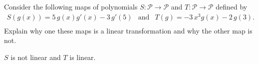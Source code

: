 
\begin{exerciseStatement}


Consider the following maps of polynomials \(S:\mathcal{P}\rightarrow\mathcal{P}\) and \(T:\mathcal{P}\rightarrow\mathcal{P}\) defined by 
\begin{align*} S(g(x))= 5 \, g\left(x\right) g'\left(x\right) - 3 \, g'\left(5\right)  & \text{and} & T(g)= -3 \, x^{3} g\left(x\right) - 2 \, g\left(3\right) . \\ \end{align*}
             Explain why one these maps is a linear transformation and why the other map is not. 


\end{exerciseStatement}
    
\begin{exerciseAnswer} 


\(S\) is not linear and \(T\) is linear.


\end{exerciseAnswer}
    
